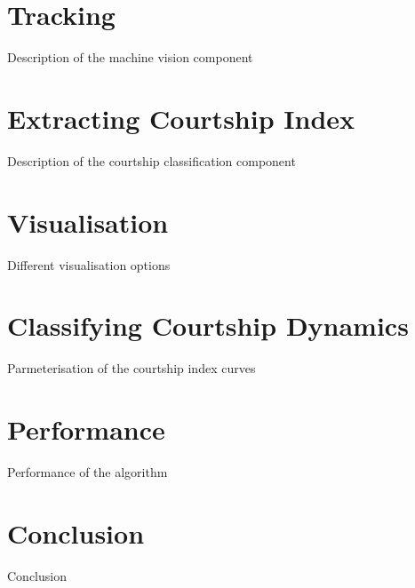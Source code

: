 \documentclass[acmtocl]{acmtrans2m}
\begin{document}
\section{Tracking}

Description of the machine vision component

\section{Extracting Courtship Index}

Description of the courtship classification component

\section{Visualisation}

Different visualisation options

\section{Classifying Courtship Dynamics}

Parmeterisation of the courtship index curves

\section{Performance}

Performance of the algorithm

\section{Conclusion}

Conclusion
\end{document}
